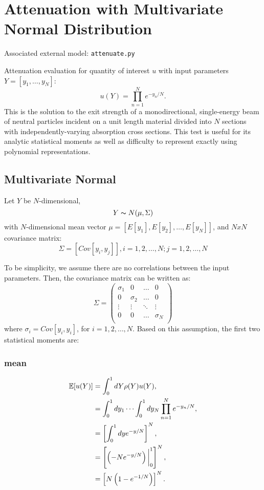 \section{Attenuation with Multivariate Normal Distribution}
Associated external model: \texttt{attenuate.py}

Attenuation evaluation for quantity of interest $u$ with input parameters $Y=[y_1,\ldots,y_N]$:
\begin{equation}
u(Y) = \prod_{n=1}^N e^{-y_n/N}.
\end{equation}
This is the solution to the exit strength of a monodirectional, single-energy beam of neutral particles
incident on a unit length material divided into $N$ sections with independently-varying absorption cross
sections.  This test is useful for its analytic statistical moments as well as difficulty to represent 
exactly using polynomial representations.

\subsection{Multivariate Normal}
Let $Y$ be $N$-dimensional,
\begin{equation}
Y \thicksim N(\mu,\Sigma)
\end{equation}
with $N$-dimensional mean vector $\mu=[E[y_1],E[y_2],\ldots,E[y_N]]$, and $NxN$ covariance matrix:
\begin{equation}
\Sigma = [Cov[y_i,y_j]],i = 1,2,\ldots,N; j = 1,2,\ldots,N
\end{equation}

To be simplicity, we assume there are no correlations between the input parameters. Then, the covariance matrix can be written
as:
\begin{equation}
\Sigma = 
\begin{pmatrix} 
\sigma_1 & 0 &\ldots & 0 \\ 
0 & \sigma_2 &\ldots & 0 \\ 
\vdots &\vdots &\ddots & \vdots \\ 
0 & 0 & \ldots & \sigma_N\\ 
\end{pmatrix} 
\end{equation}
where $\sigma_i = Cov[y_i,y_i]$, for $i = 1,2,\ldots,N$. Based on this assumption, the first two statistical moments are:
\subsubsection{mean}
\begin{align}
\mathbb{E}[ u(Y)] &=\int_{0}^1 dY \rho(Y)u(Y),\\
  &=\int_{0}^1 dy_1\cdots\int_{0}^1 dy_N \prod_{n=1}^N e^{-y_n/N},\\
  &=\left[ \int_{0}^1 dy e^{-y/N}\right]^N,\\
  &=\left[\left(-Ne^{-y/N}\right)\bigg|_0^1\right]^N,\\
  &=\left[N\left(1-e^{-1/N}\right)\right]^N.
\end{align}
